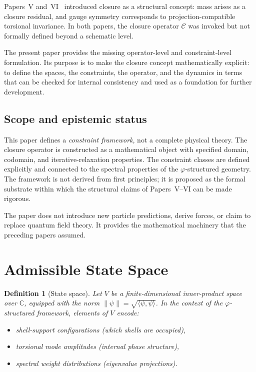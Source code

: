 \documentclass[12pt]{article}
\newtheorem{definition}[theorem]{Definition}
\newcommand{\Ccal}{\mathcal{C}}
\newcommand{\phig}{\varphi}
\begin{document}
Papers~V and~VI~\citep{SmartV, SmartVI} introduced closure as a structural concept: mass arises as a closure residual, and gauge symmetry corresponds to projection-compatible torsional invariance. In both papers, the closure operator $\Ccal$ was invoked but not formally defined beyond a schematic level.

The present paper provides the missing operator-level and constraint-level formulation. Its purpose is to make the closure concept mathematically explicit: to define the spaces, the constraints, the operator, and the dynamics in terms that can be checked for internal consistency and used as a foundation for further development.

\subsection*{Scope and epistemic status}

This paper defines a \textit{constraint framework}, not a complete physical theory. The closure operator is constructed as a mathematical object with specified domain, codomain, and iterative-relaxation properties. The constraint classes are defined explicitly and connected to the spectral properties of the $\phig$-structured geometry. The framework is not derived from first principles; it is proposed as the formal substrate within which the structural claims of Papers~V--VI can be made rigorous.

The paper does not introduce new particle predictions, derive forces, or claim to replace quantum field theory. It provides the mathematical machinery that the preceding papers assumed.

\section{Admissible State Space}\label{sec:admissible}

\begin{definition}[State space]\label{def:statespace}
Let $V$ be a finite-dimensional inner-product space over $\mathbb{C}$, equipped with the norm $\|\psi\| = \sqrt{\langle\psi,\psi\rangle}$. In the context of the $\phig$-structured framework, elements of $V$ encode:
\begin{itemize}
    \item shell-support configurations (which shells are occupied),
    \item torsional mode amplitudes (internal phase structure),
    \item spectral weight distributions (eigenvalue projections).
\end{itemize}
\end{definition}
\end{document}
